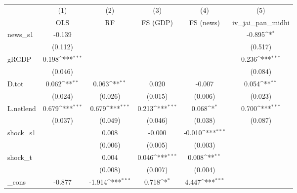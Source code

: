 {
\def\sym#1{\ifmmode^{#1}\else\(^{#1}\)\fi}
\begin{tabular}{l*{5}{c}}
\toprule
            &\multicolumn{1}{c}{(1)}&\multicolumn{1}{c}{(2)}&\multicolumn{1}{c}{(3)}&\multicolumn{1}{c}{(4)}&\multicolumn{1}{c}{(5)}\\
            &\multicolumn{1}{c}{OLS}&\multicolumn{1}{c}{RF}&\multicolumn{1}{c}{FS (GDP)}&\multicolumn{1}{c}{FS (news)}&\multicolumn{1}{c}{iv\_jai\_pan\_midhi}\\
\midrule
news\_s1     &      -0.139         &                     &                     &                     &      -0.895\sym{*}  \\
            &     (0.112)         &                     &                     &                     &     (0.517)         \\
\addlinespace
gRGDP       &       0.198\sym{***}&                     &                     &                     &       0.236\sym{***}\\
            &     (0.046)         &                     &                     &                     &     (0.084)         \\
\addlinespace
D.tot       &       0.062\sym{**} &       0.063\sym{**} &       0.020         &      -0.007         &       0.054\sym{**} \\
            &     (0.024)         &     (0.026)         &     (0.015)         &     (0.006)         &     (0.023)         \\
\addlinespace
L.netlend   &       0.679\sym{***}&       0.679\sym{***}&       0.213\sym{***}&       0.068\sym{*}  &       0.700\sym{***}\\
            &     (0.037)         &     (0.049)         &     (0.046)         &     (0.038)         &     (0.087)         \\
\addlinespace
shock\_s1    &                     &       0.008         &      -0.000         &      -0.010\sym{***}&                     \\
            &                     &     (0.006)         &     (0.005)         &     (0.003)         &                     \\
\addlinespace
shock\_t     &                     &       0.004         &       0.046\sym{***}&       0.008\sym{**} &                     \\
            &                     &     (0.008)         &     (0.007)         &     (0.004)         &                     \\
\addlinespace
\_cons      &      -0.877         &      -1.914\sym{***}&       0.718\sym{*}  &       4.447\sym{***}&                     \\

\end{tabular}}
